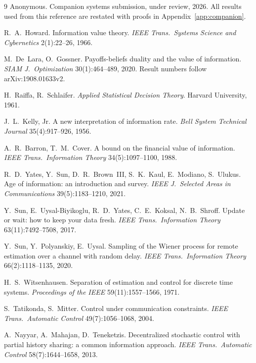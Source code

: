 \documentclass[acmsmall,screen,review,anonymous]{acmart}
\begin{document}
\begin{thebibliography}{9}
Anonymous. Companion systems submission, under review, 2026. All results
used from this reference are restated with proofs in
Appendix~\ref{app:companion}.

R.~A.~Howard. Information value theory.
\emph{IEEE Trans.\ Systems Science and Cybernetics} 2(1):22--26, 1966.

M.~De~Lara, O.~Gossner. Payoffs-beliefs duality and the value of
information. \emph{SIAM J.\ Optimization} 30(1):464--489, 2020.
Result numbers follow arXiv:1908.01633v2.

H.~Raiffa, R.~Schlaifer. \emph{Applied Statistical Decision Theory}.
Harvard University, 1961.

J.~L.~Kelly, Jr. A new interpretation of information rate.
\emph{Bell System Technical Journal} 35(4):917--926, 1956.

A.~R.~Barron, T.~M.~Cover. A bound on the financial value of information.
\emph{IEEE Trans.\ Information Theory} 34(5):1097--1100, 1988.

R.~D.~Yates, Y.~Sun, D.~R.~Brown~III, S.~K.~Kaul, E.~Modiano, S.~Ulukus.
Age of information: an introduction and survey.
\emph{IEEE J.\ Selected Areas in Communications} 39(5):1183--1210, 2021.

Y.~Sun, E.~Uysal-Biyikoglu, R.~D.~Yates, C.~E.~Koksal, N.~B.~Shroff.
Update or wait: how to keep your data fresh.
\emph{IEEE Trans.\ Information Theory} 63(11):7492--7508, 2017.

Y.~Sun, Y.~Polyanskiy, E.~Uysal. Sampling of the Wiener process for remote
estimation over a channel with random delay. \emph{IEEE Trans.\
Information Theory} 66(2):1118--1135, 2020.

H.~S.~Witsenhausen. Separation of estimation and control for discrete time
systems. \emph{Proceedings of the IEEE} 59(11):1557--1566, 1971.

S.~Tatikonda, S.~Mitter. Control under communication constraints.
\emph{IEEE Trans.\ Automatic Control} 49(7):1056--1068, 2004.

A.~Nayyar, A.~Mahajan, D.~Teneketzis. Decentralized stochastic control with
partial history sharing: a common information approach.
\emph{IEEE Trans.\ Automatic Control} 58(7):1644--1658, 2013.


\end{thebibliography}
\end{document}
